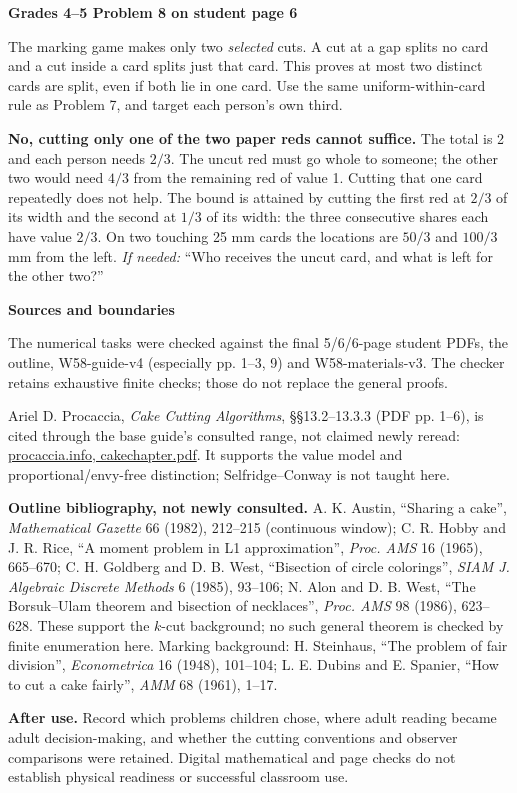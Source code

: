 \documentclass[11pt]{article}
\newcommand{\sub}[1]{\par\textbf{#1}\par}
\newcommand{\hint}[1]{\textit{If needed:} #1}
\begin{document}
\sub{Grades 4--5 Problem 8 on student page 6}
The marking game makes only two \emph{selected} cuts. A cut at a gap splits no card and a cut inside a card splits just that card. This proves at most two distinct cards are split, even if both lie in one card. Use the same uniform-within-card rule as Problem 7, and target each person's own third.

\textbf{No, cutting only one of the two paper reds cannot suffice.} The total is 2 and each person needs $2/3$. The uncut red must go whole to someone; the other two would need $4/3$ from the remaining red of value 1. Cutting that one card repeatedly does not help. The bound is attained by cutting the first red at $2/3$ of its width and the second at $1/3$ of its width: the three consecutive shares each have value $2/3$. On two touching 25 mm cards the locations are $50/3$ and $100/3$ mm from the left. \hint{``Who receives the uncut card, and what is left for the other two?''}

\sub{Sources and boundaries}
The numerical tasks were checked against the final 5/6/6-page student PDFs, the outline, W58-guide-v4 (especially pp. 1--3, 9) and W58-materials-v3. The checker retains exhaustive finite checks; those do not replace the general proofs.

Ariel D. Procaccia, \emph{Cake Cutting Algorithms}, \S\S13.2--13.3.3 (PDF pp. 1--6), is cited through the base guide's consulted range, not claimed newly reread: \href{https://procaccia.info/wp-content/uploads/2020/03/cakechapter.pdf}{procaccia.info, cakechapter.pdf}. It supports the value model and proportional/envy-free distinction; Selfridge--Conway is not taught here.

\textbf{Outline bibliography, not newly consulted.} A. K. Austin, ``Sharing a cake'', \emph{Mathematical Gazette} 66 (1982), 212--215 (continuous window); C. R. Hobby and J. R. Rice, ``A moment problem in L1 approximation'', \emph{Proc. AMS} 16 (1965), 665--670; C. H. Goldberg and D. B. West, ``Bisection of circle colorings'', \emph{SIAM J. Algebraic Discrete Methods} 6 (1985), 93--106; N. Alon and D. B. West, ``The Borsuk--Ulam theorem and bisection of necklaces'', \emph{Proc. AMS} 98 (1986), 623--628. These support the $k$-cut background; no such general theorem is checked by finite enumeration here. Marking background: H. Steinhaus, ``The problem of fair division'', \emph{Econometrica} 16 (1948), 101--104; L. E. Dubins and E. Spanier, ``How to cut a cake fairly'', \emph{AMM} 68 (1961), 1--17.

\textbf{After use.} Record which problems children chose, where adult reading became adult decision-making, and whether the cutting conventions and observer comparisons were retained. Digital mathematical and page checks do not establish physical readiness or successful classroom use.
\end{document}
